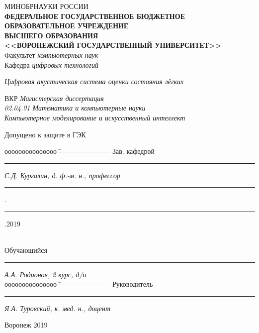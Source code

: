 \documentclass[../main.tex]{subfiles}
\begin{document}
\begin{spacing}{1.2}
{
\sffamily 
\begin{small}
\thispagestyle{empty}
\center 
{МИНОБРНАУКИ РОССИИ}\\ \!
{\footnotesize\textbf{ФЕДЕРАЛЬНОЕ ГОСУДАРСТВЕННОЕ БЮДЖЕТНОЕ ОБРАЗОВАТЕЛЬНОЕ УЧРЕЖДЕНИЕ}\\ \!\!\textbf{ВЫСШЕГО ОБРАЗОВАНИЯ}}\\ \!\!\!\!
\textbf{<<ВОРОНЕЖСКИЙ ГОСУДАРСТВЕННЫЙ УНИВЕРСИТЕТ>>}\\
\vspace{1.5cm}
{Факультет \textit{компьютерных наук}}\\
\vspace{0.25cm}
{Кафедра \textit{цифровых технологий}}\\

\vspace{2cm}

\textit{Цифровая акустическая система оценки состояния лёгких}\\

\vspace{1cm}

{ВКР} \textit{Магистерская диссертация}\\
\textit{02.04.01 Математика и компьютерные науки}\\
\textit{Компьютерное моделирование и искусственный интеллект}\\

\vspace{2cm}
\begin{flushleft}
{Допущено к защите в ГЭК}
\end{flushleft}
\begin{tabbing}
ооооооооооооооо	\=	----------------------	\kill
Зав. кафедрой\> 	\rule[0mm]{3cm}{0,3mm}	\textit{С.Д. Кургалин, д. ф.-м. н., профессор}{ \rule[0mm]{5mm}{0,3mm}.\rule[0mm]{5mm}{0,3mm}.2019}  \\
Обучающийся \> 	\rule[0mm]{3cm}{0,3mm}	\textit{А.А. Родионов, 2 курс, д/о} \\ 
ооооооооооооооо	\=	----------------------	\kill
Руководитель\> 	\rule[0mm]{3cm}{0,3mm}  \textit{Я.А. Туровский, к. мед. н., доцент }
\end{tabbing}

\vspace{4cm}

\centerline{Воронеж 2019}
\end{small}
}
\end{spacing}
\clearpage
\end{document}
